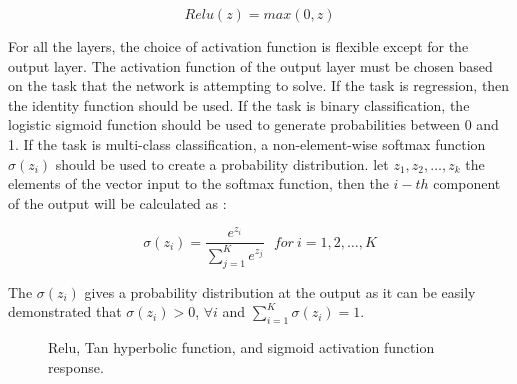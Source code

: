 \begin{equation}
    \label{eq:RELU}
    Relu(z) = max(0, z)
\end{equation}

For all the layers, the choice of activation function is flexible except for the output layer. The activation function of the output layer must be chosen based on the task that the network is attempting to solve. If the task is regression, then the identity function should be used. If the task is binary classification, the logistic sigmoid function should be used to generate probabilities between 0 and 1. If the task is multi-class classification, a non-element-wise softmax function  $\sigma(z_i)$ should be used to create a probability distribution. let $z_1, z_2, \dots, z_k$ the elements of the vector input to the softmax function, then the $i-th$ component of the output will be calculated as :

\begin{equation}
    \label{eq:softmax}
    \sigma(z_i) = \frac{e^{z_{i}}}{\sum_{j=1}^K e^{z_{j}}} \ \ \ for\ i=1,2,\dots,K
\end{equation}

The  $\sigma(z_i)$ gives a probability distribution at the output as it can be easily demonstrated that $\sigma(z_i) > 0 $, $\forall i$ and $\sum_{i=1}^{K} \sigma(z_i) =1$. 

\begin{figure}
  \centering
  \caption{Relu, Tan hyperbolic function, and sigmoid activation function response.}
  \label{fig:multiple-figures}
\end{figure}


